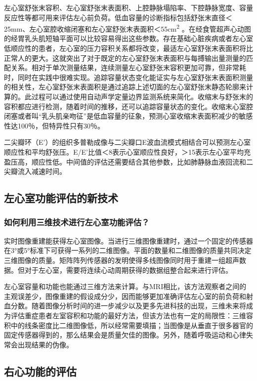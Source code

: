 左心室舒张末容积、左心室舒张末表面积、上腔静脉塌陷率、下腔静脉宽度、容量反应性等都可用来评估左心前负荷。低血容量的诊断指标包括舒张末直径＜25mm、左心室腔收缩闭塞和左心室舒张末表面积＜55cm\textsuperscript{2}
。在经食管超声心动图的经胃乳头肌短轴平面可以比较容易得出这些参数。存在基础心脏疾病或者左心室低顺应性的患者，左心室的压力容积关系都将改变，最适左心室舒张末表面积将比正常人的更大。这就突出了对于既定的左心室舒张末表面积与每搏输出量测量的匹配关系。相对于单次测量结果，连续测量左心室舒张末容积更加可靠，但非常耗时，同时在实践中很难实现。追踪容量状态变化能证实与左心室舒张末表面积测量的相关性，左心室舒张末表面积是通过追踪上述切面的左心室舒张末静态轮廓来计算的。此过程可以通过使用自动声学定量边界监测系统来简化。收缩末与舒张末的容积都应进行检测，随着时间的推移，还可以追踪容量状态的变化。收缩末心室腔闭塞或者叫“乳头肌亲吻征”是低血容量的征象，预测心室收缩末表面积减少的敏感性达100％，但特异性只有30％。

二尖瓣环（E'）的组织多普勒成像与二尖瓣口E波血流模式相结合可以预测左心室顺应性和平均舒张压。E/E'比值＜8表示心室顺应性良好，＞15表示左心室平均充盈压高，顺应性低。中间值的评估还需要结合其他参数，比如肺静脉血液回流和二尖瓣流入减速时间。

\subsection{左心室功能评估的新技术}

\subsubsection{如何利用三维技术进行左心室功能评估？}

实时图像重建能获得左心室图像。当进行三维图像重建时，通过一个固定的传感器在3°或5°标准下可获得一系列的二维图像。平面的数量和二维图像的质量共同决定三维图像的质量。矩阵阵列传感器的发明使得多线图像同时用于重建一组超声数据。但对于左心室，需要将连续心动周期获得的数据组整合起来进行评估。

左心室容量和功能也能通过三维方法来计算。与MRI相比，该方法观察者之间的主观误差少，图像重建的假设成分少，因而能够更加准确评估左心室的前负荷和射血分数。随着图像分析时间的进一步减少以及更多先进科技的出现，三维未来将成为评估重症患者左室容积和功能的最好方法，但该方法也有一定的局限性：三维容积中的线条密度比二维图像低，所以经常需要填描；当图像是从垂直于很多器官的固定传感器得到的，那么结果会是质量欠佳的图像。另外，随着呼吸运动和心律失常会出现结果的伪像。

\subsection{右心功能的评估}

